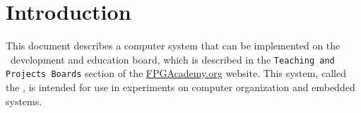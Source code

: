 \section{Introduction}
This document describes a computer system that can be implemented
on the \DEBoard~development and education board, which
is described in the \texttt{Teaching and Projects Boards} 
section of the {\small \href{https://www.fpgacademy.org/boards.html} {FPGAcademy.org}} website. 
This system, called the {\it \systemNameFull}, is intended for use in
experiments on computer organization and embedded
systems. 

